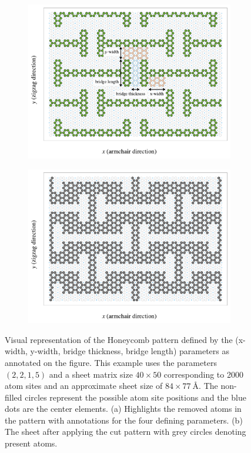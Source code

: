 \begin{figure}[h]
  \centering
  \begin{subfigure}[t]{0.48\textwidth}
      \centering
      \includegraphics[width=\textwidth]{figures/system/honeycomb_inverse.pdf}
      \caption{}
      \label{fig:honeycomb_a}
    \end{subfigure}
    \hfill
    \begin{subfigure}[t]{0.48\textwidth}
      \centering
      \includegraphics[width=\textwidth]{figures/system/honeycomb_pattern.pdf}
      \caption{}
      \label{fig:honeycomb_b}
  \end{subfigure}
  \hfill
     \caption{Visual representation of the Honeycomb pattern defined by the (x-width, y-width, bridge thickness, bridge length) parameters as annotated on the figure. This example uses the parameters $(2,2,1,5)$ and a sheet matrix size $40 \times 50$ corresponding to 2000 atom sites and an approximate sheet size of $84 \times \SI{77}{\text{Å}}$. The non-filled circles represent the possible atom site positions and the blue dots are the center elements. (a) Highlights the removed atoms in the pattern with annotations for the four defining parameters. (b) The sheet after applying the cut pattern with grey circles denoting present atoms. }
     \label{fig:honeycomb}
\end{figure}


